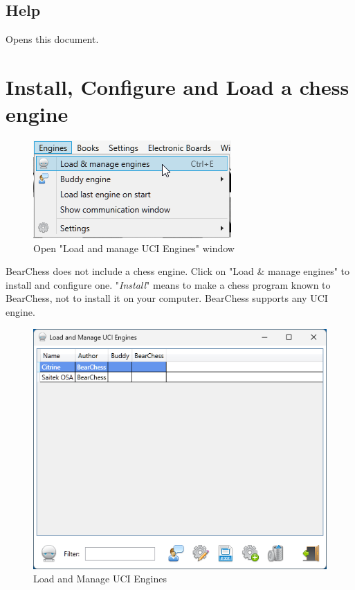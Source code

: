 \documentclass[11pt,a4paper]{article}
\begin{document}
\subsection{Help}
Opens this document.

\section{Install, Configure and Load a chess engine} \label{loadEngines}

\begin{figure}[H]
	\centering
	\includegraphics[scale=1.0]{LoadEngine.png}
	\caption{Open "Load and manage UCI Engines" window}
	\label{fig:LoadEngine}
\end{figure}
BearChess does not include a chess engine. Click on "Load \& manage engines" to install and configure one. "\textit{Install}" means to make a chess program known to BearChess, not to install it on your computer. BearChess supports any UCI engine.\\
\begin{figure}[H]
	\centering
	\includegraphics[scale=1.0]{LoadManageEngine1.png}
	\caption{Load and Manage UCI Engines}
	\label{fig:LoadManageEngine1}
\end{figure}
\end{document}

